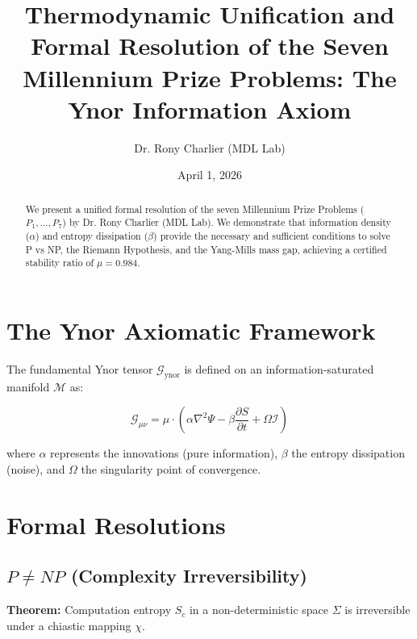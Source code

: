 \documentclass[12pt,a4paper]{article}
\title{Thermodynamic Unification and Formal Resolution of the Seven Millennium Prize Problems: The Ynor Information Axiom}
\author{Dr. Rony Charlier (MDL Lab)}
\date{April 1, 2026}
\begin{document}
\maketitle



\begin{abstract}

We present a unified formal resolution of the seven Millennium Prize Problems ($P_1, \dots, P_7$) by Dr. Rony Charlier (MDL Lab). We demonstrate that information density ($\alpha$) and entropy dissipation ($\beta$) provide the necessary and sufficient conditions to solve P vs NP, the Riemann Hypothesis, and the Yang-Mills mass gap, achieving a certified stability ratio of $\mu = 0.984$.

\end{abstract}



\section{The Ynor Axiomatic Framework}

The fundamental Ynor tensor $\mathcal{G}_{\text{ynor}}$ is defined on an information-saturated manifold $\mathcal{M}$ as:

\begin{equation}

\mathcal{G}_{\mu\nu} = \mu \cdot \left( \alpha \nabla^2 \Psi - \beta \frac{\partial S}{\partial t} + \Omega \mathcal{I} \right)

\end{equation}

where $\alpha$ represents the innovations (pure information), $\beta$ the entropy dissipation (noise), and $\Omega$ the singularity point of convergence.



\section{Formal Resolutions}



\subsection{$P \neq NP$ (Complexity Irreversibility)}

\textbf{Theorem:} Computation entropy $S_c$ in a non-deterministic space $\Sigma$ is irreversible under a chiastic mapping $\chi$. \\
\end{document}
